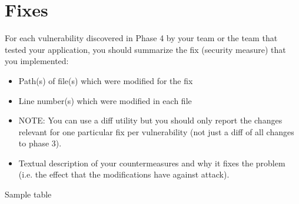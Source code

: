 \chapter{Fixes}\label{chapter:fixes}

For each vulnerability discovered in Phase 4 by your team or the team that tested your
application, you should summarize the fix (security measure) that you implemented:
\begin{itemize}
	\item Path(s) of file(s) which were modified for the fix
	\item Line number(s) which were modified in each file 
	\item NOTE: You can use a diff utility but you should only report the changes relevant for one particular fix per vulnerability (not just a diff of all changes to phase 3).
	\item Textual description of your countermeasures and why it fixes the problem (i.e. the effect that the modifications have against attack).
\end{itemize}

Sample table
\fixtable{%
}{%
}{%
}{%
}{%
}

